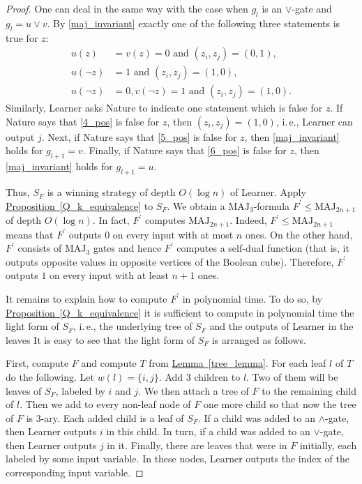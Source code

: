 \documentclass[11pt]{article}
\numberwithin{equation}{section}
\theoremstyle{definition}
\theoremstyle{plain}
\newcommand{\ie}{i.\,e.}
\newcommand{\expref}[2]{\hyperref[#2]{#1~\ref{#2}}}
\def\MAJ{\mathrm{MAJ}}
\begin{document}
\begin{proof}
One can deal in the same way with the case when $g_l$ is an $\lor$-gate and $g_l = u \lor v$. By \eqref{maj_invariant} exactly one of the following three statements is true for $z$:
\begin{align}
\label{4_pos}
u(z) &=   v(z) = 0 \mbox{ and } (z_i, z_j) = (0,1), \\
\label{5_pos}
u(\lnot z) &= 1 \mbox{ and } (z_i,z_j) = (1,0),\\
\label{6_pos}
u(\lnot z) &= 0,  v(\lnot z) = 1 \mbox{ and } (z_i,z_j) = (1,0).
\end{align}
Similarly, Learner asks Nature to indicate one statement which is false for $z$. If Nature says that \eqref{4_pos} is false for $z$, then $(z_i,z_j) = (1,0)$, \ie, Learner can output $j$. Next, if Nature says that \eqref{5_pos} is false for $z$, then   \eqref{maj_invariant} holds for $g_{l + 1} = v$. Finally, if Nature says that \eqref{6_pos} is false for $z$, then \eqref{maj_invariant} holds for $g_{l + 1} = u$.

Thus, $S_F$ is 
%
a winning strategy of depth $O(\log n)$  %
of Learner. Apply \expref{Proposition}{Q_k_equivalence} to $S_F$. 
%
We obtain  %
%
%
a $\MAJ_3$-formula $F^\prime \le \MAJ_{2n + 1}$
of depth $O(\log n)$.  %
In fact, $F^\prime$ computes $\MAJ_{2n + 1}$. Indeed, $F^\prime \le \MAJ_{2n + 1}$ means that $F^\prime$ outputs $0$ on every input with at most $n$ ones. On the other hand, $F^\prime$ consists of $\MAJ_3$ gates and hence $F^\prime$ computes a self-dual function (that is, it outputs opposite values in opposite vertices of the Boolean cube). Therefore, $F^\prime$ outputs $1$ on every input with at least $n + 1$ ones.

It remains to explain how to  compute $F^\prime$ in polynomial time. To do so, by \expref{Proposition}{Q_k_equivalence} it is sufficient to compute in polynomial time the light form of $S_F$, \ie, the underlying tree of $S_F$ and  the outputs of Learner in the %
leaves  %
%
It is easy to see that the light form of $S_F$ is arranged as follows.

First, compute $F$ and compute $T$ from \expref{Lemma}{tree_lemma}. For each leaf $l$ of $T$ do the following. Let $w(l) = \{i, j\}$. Add $3$ children to $l$. Two of them will be leaves of $S_F$, labeled by $i$ and $j$. We then attach a tree of $F$ to the remaining child of $l$.   Then we add to every non-leaf node of $F$ one more child so that now the tree of $F$ is $3$-ary. Each added child is a leaf of $S_F$. If a child was added to an $\land$-gate, then Learner outputs $i$ in this child. In turn, if a child was added to an $\lor$-gate, then Learner outputs $j$ in it. Finally, there are leaves that were in $F$ initially, each labeled by some input variable. In these nodes, Learner outputs the index of the corresponding input variable.
\end{proof}
\end{document}
